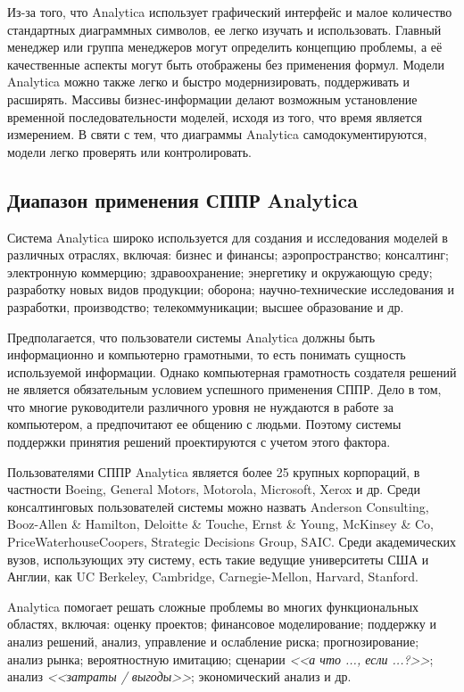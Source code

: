 Из-за того, что Analytica использует графический интерфейс и малое
количество стандартных диаграммных символов, ее легко изучать и использовать.
Главный менеджер или группа менеджеров могут определить концепцию проблемы,
а её качественные аспекты могут быть отображены без применения формул.
Модели Analytica можно также легко и быстро модернизировать, поддерживать и расширять.
Массивы бизнес-информации делают возможным установление временной последовательности
моделей, исходя из того, что время является измерением. В святи с тем,
что диаграммы Analytica самодокументируются, модели легко проверять или контролировать.


\subsection{Диапазон применения СППР Analytica}

Система Analytica широко используется для создания и исследования моделей
в различных отраслях, включая: бизнес и финансы; аэропространство; консалтинг;
электронную коммерцию; здравоохранение; энергетику и окружающую среду;
разработку новых видов продукции; оборона; научно-технические исследования
и разработки, производство; телекоммуникации; высшее образование и др.

Предполагается, что пользователи системы Analytica должны быть информационно
и компьютерно грамотными, то есть понимать сущность используемой информации.
Однако компьютерная грамотность создателя решений не является обязательным
условием успешного применения СППР. Дело в том, что многие руководители
различного уровня не нуждаются в работе за компьютером, а предпочитают
ее общению с людьми. Поэтому системы поддержки принятия решений проектируются
с учетом этого фактора.

Пользователями СППР Analytica является более 25 крупных корпораций,
в частности Boeing, General Motors, Motorola, Microsoft, Xerox и др.
Среди консалтинговых пользователей системы можно назвать Anderson Consulting,
Booz-Allen \& Hamilton, Deloitte \& Touche, Ernst \& Young,
McKinsey \& Co, PriceWaterhouseCoopers, Strategic Decisions Group, SAIC.
Среди академических вузов, использующих эту систему, есть такие
ведущие университеты США и Англии, как UC Berkeley, Cambridge, Carnegie-Mellon,
Harvard, Stanford.

Analytica помогает решать сложные проблемы во многих функциональных областях,
включая: оценку проектов; финансовое моделирование; поддержку и анализ решений,
анализ, управление и ослабление риска; прогнозирование; анализ рынка;
вероятностную имитацию; сценарии \textit{<<а что ..., если ...?>>};
анализ \textit{<<затраты / выгоды>>}; экономический анализ и др.


